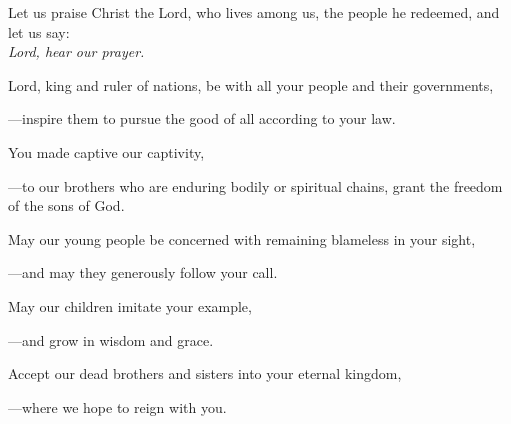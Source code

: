 \intercessions\indent

\begin{hangpar}

Let us praise Christ the Lord, who lives among us, the people he redeemed, and let us say:\\
\emph{Lord, hear our prayer.}

\medskip Lord, king and ruler of nations, be with all your people and their governments,

{\color{red}---\thinspace}inspire them to pursue the good of all according to your law.

\medskip You made captive our captivity,

{\color{red}---\thinspace}to our brothers who are enduring bodily or spiritual chains, grant the freedom of the sons of God.

\medskip May our young people be concerned with remaining blameless in your sight,

{\color{red}---\thinspace}and may they generously follow your call.

\medskip May our children imitate your example,

{\color{red}---\thinspace}and grow in wisdom and grace.

\medskip Accept our dead brothers and sisters into your eternal kingdom,

{\color{red}---\thinspace}where we hope to reign with you.

\end{hangpar}

